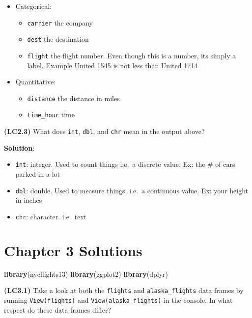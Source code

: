 \documentclass[12pt,]{krantz}
\makeatletter
\newenvironment{Shaded}{\begin{snugshade}}{\end{snugshade}}
\newcommand{\KeywordTok}[1]{\textcolor[rgb]{0.27,0.27,0.27}{\textbf{#1}}}
\newcommand{\NormalTok}[1]{#1}
\providecommand{\tightlist}{%
  \setlength{\itemsep}{0pt}\setlength{\parskip}{0pt}}
\newenvironment{kframe}{%
\medskip{}
\setlength{\fboxsep}{.8em}
 \def\at@end@of@kframe{}%
 \ifinner\ifhmode%
  \def\at@end@of@kframe{\end{minipage}}%
  \begin{minipage}{\columnwidth}%
 \fi\fi%
 \def\FrameCommand##1{\hskip\@totalleftmargin \hskip-\fboxsep
 \colorbox{shadecolor}{##1}\hskip-\fboxsep
     \hskip-\linewidth \hskip-\@totalleftmargin \hskip\columnwidth}%
 \MakeFramed {\advance\hsize-\width
   \@totalleftmargin\z@ \linewidth\hsize
   \@setminipage}}%
 {\par\unskip\endMakeFramed%
 \at@end@of@kframe}
\renewenvironment{Shaded}{\begin{kframe}}{\end{kframe}}
\theoremstyle{definition}
\theoremstyle{definition}
\theoremstyle{definition}
\theoremstyle{remark}
\makeatother
\begin{document}
\begin{itemize}
\tightlist
\item
  Categorical:

  \begin{itemize}
  \tightlist
  \item
    \texttt{carrier} the company
  \item
    \texttt{dest} the destination
  \item
    \texttt{flight} the flight number. Even though this is a number, its
    simply a label. Example United 1545 is not less than United 1714
  \end{itemize}
\item
  Quantitative:

  \begin{itemize}
  \tightlist
  \item
    \texttt{distance} the distance in miles
  \item
    \texttt{time\_hour} time
  \end{itemize}
\end{itemize}

\textbf{(LC2.3)} What does \texttt{int}, \texttt{dbl}, and \texttt{chr}
mean in the output above?

\textbf{Solution}:

\begin{itemize}
\tightlist
\item
  \texttt{int}: integer. Used to count things i.e.~a discrete value. Ex:
  the \# of cars parked in a lot
\item
  \texttt{dbl}: double. Used to measure things. i.e.~a continuous value.
  Ex: your height in inches
\item
  \texttt{chr}: character. i.e.~text
\end{itemize}

\section{Chapter 3 Solutions}\label{chapter-3-solutions}

\begin{Shaded}
\begin{Highlighting}[]
\KeywordTok{library}\NormalTok{(nycflights13)}
\KeywordTok{library}\NormalTok{(ggplot2)}
\KeywordTok{library}\NormalTok{(dplyr)}
\end{Highlighting}
\end{Shaded}

\textbf{(LC3.1)} Take a look at both the \texttt{flights} and
\texttt{alaska\_flights} data frames by running \texttt{View(flights)}
and \texttt{View(alaska\_flights)} in the console. In what respect do
these data frames differ?
\end{document}
